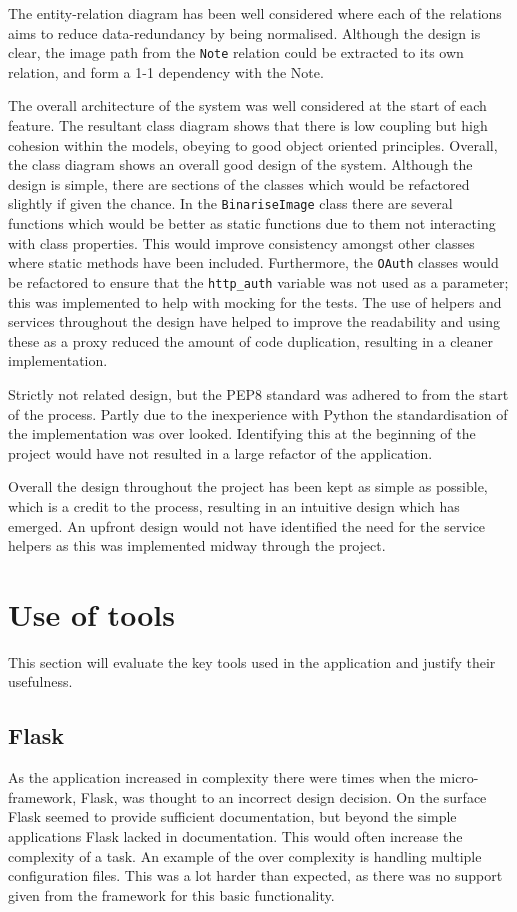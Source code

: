 The entity-relation diagram has been well considered where each of the relations aims to reduce data-redundancy by being normalised. Although the design is clear, the image path from the \texttt{Note} relation could be extracted to its own relation, and form a 1-1 dependency with the Note.

The overall architecture of the system was well considered at the start of each feature. The resultant class diagram shows that there is low coupling but high cohesion within the models, obeying to good object oriented principles. Overall, the class diagram shows an overall good design of the system. Although the design is simple, there are sections of the classes which would be refactored slightly if given the chance. In the \texttt{BinariseImage} class there are several functions which would be better as static functions due to them not interacting with class properties. This would improve consistency amongst other classes where static methods have been included. Furthermore, the \texttt{OAuth} classes would be refactored to ensure that the \texttt{http_auth} variable was not used as a parameter; this was implemented to help with mocking for the tests. The use of helpers and services throughout the design have helped to improve the readability and using these as a proxy reduced the amount of code duplication, resulting in a cleaner implementation.

Strictly not related design, but the PEP8 standard \cite{citeulike:1402014} was adhered to from the start of the process. Partly due to the inexperience with Python the standardisation of the implementation was over looked. Identifying this at the beginning of the project would have not resulted in a large refactor of the application.

Overall the design throughout the project has been kept as simple as possible, which is a credit to the process, resulting in an intuitive design which has emerged. An upfront design would not have identified the need for the service helpers as this was implemented midway through the project.

\section{Use of tools}
This section will evaluate the key tools used in the application and justify their usefulness.

\subsection{Flask}
As the application increased in complexity there were times when the micro-framework, Flask, was thought to an incorrect design decision. On the surface Flask seemed to provide sufficient documentation, but beyond the simple applications Flask lacked in documentation. This would often increase the complexity of a task. An example of the over complexity is handling multiple configuration files. This was a lot harder than expected, as there was no support given from the framework for this basic functionality.

